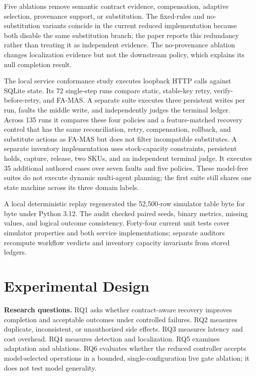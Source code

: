 \documentclass[10pt,journal,compsoc]{IEEEtran}
\newcommand{\famas}{FA-MAS}
\begin{document}
Five ablations remove semantic contract evidence, compensation, adaptive selection, provenance support, or substitution. The fixed-rules and no-substitution variants coincide in the current reduced implementation because both disable the same substitution branch; the paper reports this redundancy rather than treating it as independent evidence. The no-provenance ablation changes localization evidence but not the downstream policy, which explains its null completion result.

The local service conformance study executes loopback HTTP calls against SQLite state. Its 72 single-step runs compare static, stable-key retry, verify-before-retry, and \famas{}. A separate suite executes three persistent writes per run, faults the middle write, and independently judges the terminal ledger. Across 135 runs it compares these four policies and a feature-matched recovery control that has the same reconciliation, retry, compensation, rollback, and substitute actions as \famas{} but does not filter incompatible substitutes. A separate inventory implementation uses stock-capacity constraints, persistent holds, capture, release, two SKUs, and an independent terminal judge. It executes 35 additional authored cases over seven faults and five policies. These model-free suites do not execute dynamic multi-agent planning; the first suite still shares one state machine across its three domain labels.

A local deterministic replay regenerated the 52,500-row simulator table byte for byte under Python 3.12. The audit checked paired seeds, binary metrics, missing values, and logical outcome consistency. Forty-four current unit tests cover simulator properties and both service implementations; separate auditors recompute workflow verdicts and inventory capacity invariants from stored ledgers.

\section{Experimental Design}\label{sec:design}
\textbf{Research questions.} RQ1 asks whether contract-aware recovery improves completion and acceptable outcomes under controlled failures. RQ2 measures duplicate, inconsistent, or unauthorized side effects. RQ3 measures latency and cost overhead. RQ4 measures detection and localization. RQ5 examines adaptation and ablations. RQ6 evaluates whether the reduced controller accepts model-selected operations in a bounded, single-configuration live gate ablation; it does not test model generality.
\end{document}
